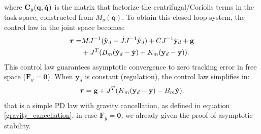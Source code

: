 \documentclass[10pt, a4paper]{report}
\newcommand{\y}{{\mathbf y}}
\newcommand{\q}{{\mathbf q}}
\begin{document}
where $\mathbf C_y(\q,\dq)$ is the matrix that factorize the centrifugal/Coriolis terms in the task space, constructed from $M_y(\q)$. To obtain this closed loop system, the control law in the joint space becomes:\begin{align}
    \btau=&MJ^{-1}(\ddy_d-\dot JJ^{-1}\dy_d)+CJ^{-1}\dy_d+\mathbf g\\
    &+J^T(B_m(\dy_d-\dy)+K_m(\y_d-\y)).
\end{align}
This control law guarantees asymptotic convergence to zero tracking error in free space ($\mathbf F_y=\mathbf 0$). When $\y_d$ is constant (regulation), the control law simplifies in:\begin{equation}\label{impedance_regulation}
    \btau=\mathbf g+J^T(K_m(\y_d-\y)-B_m\dy).
\end{equation}
that is a simple PD law with gravity cancellation, as defined in equation \eqref{gravity_cancellation}, in case $\mathbf F_y=\mathbf 0$, we already given the proof of asymptotic stability.\bigskip
\end{document}
